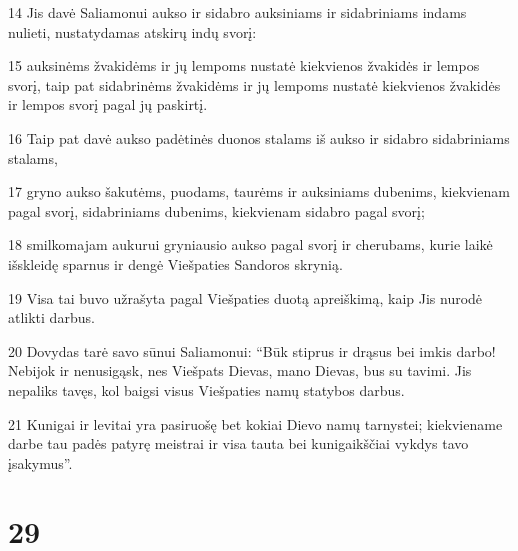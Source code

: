 \par 14 Jis davė Saliamonui aukso ir sidabro auksiniams ir sidabriniams indams nulieti, nustatydamas atskirų indų svorį: 
\par 15 auksinėms žvakidėms ir jų lempoms nustatė kiekvienos žvakidės ir lempos svorį, taip pat sidabrinėms žvakidėms ir jų lempoms nustatė kiekvienos žvakidės ir lempos svorį pagal jų paskirtį. 
\par 16 Taip pat davė aukso padėtinės duonos stalams iš aukso ir sidabro sidabriniams stalams, 
\par 17 gryno aukso šakutėms, puodams, taurėms ir auksiniams dubenims, kiekvienam pagal svorį, sidabriniams dubenims, kiekvienam sidabro pagal svorį; 
\par 18 smilkomajam aukurui gryniausio aukso pagal svorį ir cherubams, kurie laikė išskleidę sparnus ir dengė Viešpaties Sandoros skrynią. 
\par 19 Visa tai buvo užrašyta pagal Viešpaties duotą apreiškimą, kaip Jis nurodė atlikti darbus. 
\par 20 Dovydas tarė savo sūnui Saliamonui: “Būk stiprus ir drąsus bei imkis darbo! Nebijok ir nenusigąsk, nes Viešpats Dievas, mano Dievas, bus su tavimi. Jis nepaliks tavęs, kol baigsi visus Viešpaties namų statybos darbus. 
\par 21 Kunigai ir levitai yra pasiruošę bet kokiai Dievo namų tarnystei; kiekviename darbe tau padės patyrę meistrai ir visa tauta bei kunigaikščiai vykdys tavo įsakymus”.



\chapter{29}

